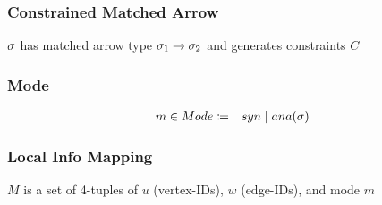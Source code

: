 \subsubsection{Constrained Matched Arrow}

 $\STMV$ has matched arrow type $\TArrow{\STMV_1}{\STMV_2}$ and generates constraints $C$
\begin{mathpar}

\end{mathpar}


\subsubsection{Mode}
%
\[
\begin{array}{cc}
    m \in Mode \coloneqq & syn \mid ana(\STMV) \\
\end{array}
\]

\subsubsection{Local Info Mapping}

%
$M$ is a set of 4-tuples of $u$ (vertex-IDs), $w$ (edge-IDs), \ctx and mode $m$



